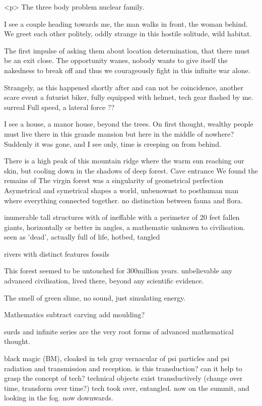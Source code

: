 \documentclass{article}
\begin{document}
<p>
The three body problem 
nuclear family. 


I see a couple heading towards me, 
the man walks in front, the woman behind.
We greet each other politely,
oddly strange in this hostile solitude, wild habitat.


The first impulse of asking them about 
location determination,
that there must be an exit close.
The opportunity wanes, nobody wants to give itself the nakedness to break off
and thus we courageously fight in this 
infinite war alone.

Strangely, as this happened shortly after and can not be coincidence,
another scare event 
a futurist biker, fully equipped with helmet, tech gear
flashed by me. surreal
Full speed, a lateral force ?? 


I see a house, a manor house, beyond the trees.
On first thought, wealthy people must live there in this grande mansion
but here in the middle of nowhere?
Suddenly it was gone, and I see only,
time is creeping on from behind.





There is a high peak of this mountain ridge
where the warm sun reaching our skin, but cooling down in the shadows of deep forest.
Cave entrance
We found the remains of 
The virgin forest was a singularity of geometrical perfection
Asymetrical and symetrical shapes
a world, unbenownst to posthuman man
where everything connected together. 
no distinction between fauna and flora.


inumerable tall structures with of ineffable 
with a perimeter of 20 feet
fallen giants, horizontally or 
better in angles, 
a mathematic unknown to civilisation.
seen as 'dead', actually full of life,
hotbed, tangled  

rivers with distinct features
fossils

This forest seemed to be untouched for 300million years.
unbelievable any advanced civilisation, lived there, 
beyond any scientific evidence. 

The smell of green slime, no sound, just simulating energy.

Mathematics
subtract carving 
add moulding?

surds and infinite series are the very root forms of advanced mathematical thought.

black magic (BM), cloaked in teh gray vernacular of psi particles and psi radiation
and transmission and reception. is this transduction?
can it help to grasp the concept of tech?
technical objects exist transductively (change over time, transform over time?)
tech took over, entangled. now on the summit, and looking in the fog.
now downwards. 
\end{document}
